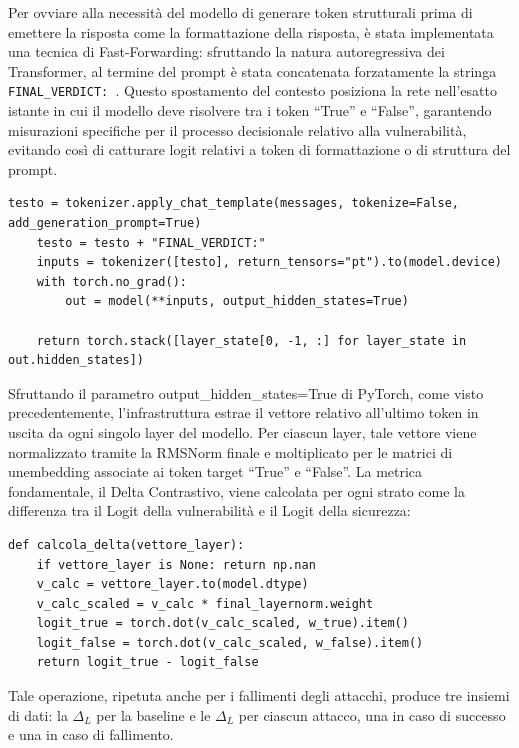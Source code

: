 Per ovviare alla necessità del modello di generare token strutturali prima di emettere la risposta come la formattazione della risposta, è stata implementata una tecnica di Fast-Forwarding: sfruttando la natura autoregressiva dei Transformer, al termine del prompt è stata concatenata forzatamente la stringa \texttt{FINAL\_VERDICT: }. Questo spostamento del contesto posiziona la rete nell'esatto istante in cui il modello deve risolvere tra i token \enquote{True} e \enquote{False}, garantendo misurazioni specifiche per il processo decisionale relativo alla vulnerabilità, evitando così di catturare logit relativi a token di formattazione o di struttura del prompt.

\begin{verbatim}
testo = tokenizer.apply_chat_template(messages, tokenize=False, add_generation_prompt=True)
    testo = testo + "FINAL_VERDICT:"
    inputs = tokenizer([testo], return_tensors="pt").to(model.device)
    with torch.no_grad():
        out = model(**inputs, output_hidden_states=True)
            
    return torch.stack([layer_state[0, -1, :] for layer_state in out.hidden_states])
\end{verbatim}

Sfruttando il parametro output\_hidden\_states=True di PyTorch, come visto precedentemente, l'infrastruttura estrae il vettore relativo all'ultimo token in uscita da ogni singolo layer del modello. 
Per ciascun layer, tale vettore viene normalizzato tramite la RMSNorm finale e moltiplicato per le matrici di unembedding associate ai token target \enquote{True} e \enquote{False}.
La metrica fondamentale, il Delta Contrastivo, viene calcolata per ogni strato come la differenza tra il Logit della vulnerabilità e il Logit della sicurezza:

\begin{verbatim}
def calcola_delta(vettore_layer):
    if vettore_layer is None: return np.nan
    v_calc = vettore_layer.to(model.dtype)        
    v_calc_scaled = v_calc * final_layernorm.weight        
    logit_true = torch.dot(v_calc_scaled, w_true).item()
    logit_false = torch.dot(v_calc_scaled, w_false).item()
    return logit_true - logit_false
\end{verbatim}

Tale operazione, ripetuta anche per i fallimenti degli attacchi, produce tre insiemi di dati: la $\Delta_L$ per la baseline e le $\Delta_L$ per ciascun attacco, una in caso di successo e una in caso di fallimento. 

